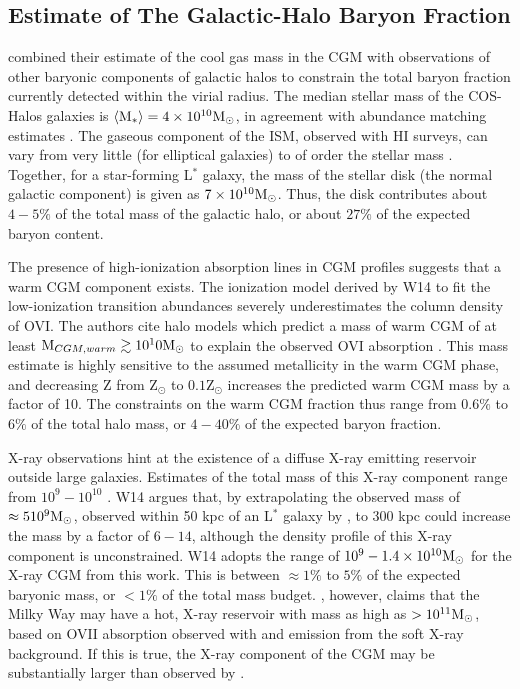 \subsection{Estimate of The Galactic-Halo Baryon Fraction}
\label{sec:Galaxy.Fraction}

\citet{Werk2014} combined their estimate of the cool gas mass in the
CGM with observations of other baryonic components of galactic halos
to constrain the total baryon fraction currently detected within the
virial radius. The median stellar mass of the COS-Halos galaxies is
$\left<\textrm{M}{}_*\right> = 4\times 10^{10}\textrm{M}_\odot$, in agreement with
abundance matching estimates \citep{Behroozi2010}. The gaseous
component of the ISM, observed with HI surveys, can vary from very
little (for elliptical galaxies) to of order the stellar mass
\citep{McGaugh2010, Martin2010}. Together, for a star-forming L$^*$
galaxy, the mass of the stellar disk (the normal galactic component)
is given as $7\times 10^{10}\textrm{M}_\odot{}$. Thus, the disk contributes about
$4-5\%$ of the total mass of the galactic halo, or about $27\%$ of the
expected baryon content.

The presence of high-ionization absorption lines in CGM profiles
suggests that a warm CGM component exists. The ionization model
derived by W14 to fit the low-ionization transition
abundances severely underestimates the column density of OVI. The
authors cite halo models which predict a mass of warm CGM of at least
$\textrm{M}_{CGM, warm} \gtrsim 10^10\textrm{M}_\odot{}$ to explain the observed OVI
absorption \citep{Peeples2014}. This mass estimate is highly sensitive
to the assumed metallicity in the warm CGM phase, and decreasing Z
from Z$_\odot$ to $0.1$Z$_\odot$ increases the predicted warm CGM mass
by a factor of 10. The constraints on the warm CGM fraction thus range
from $0.6\%$ to $6\%$ of the total halo mass, or $4-40\%$ of the
expected baryon fraction. 

X-ray observations hint at the existence of a diffuse X-ray emitting
reservoir outside large galaxies. Estimates of the total mass of this
X-ray component range from $10^9 - 10^{10}$ \Msun{}. W14 argues that,
by extrapolating the observed mass of $\approx 510^9\textrm{M}_\odot{}$, observed
within 50 kpc of an L$^*$ galaxy by \Rosat{} \citep{Anderson2013}, to
300 kpc could increase the mass by a factor of $6-14$, although the
density profile of this X-ray component is unconstrained. W14 adopts
the range of $10^9 - 1.4\times 10^{10}\textrm{M}_\odot{}$ for the X-ray CGM from this
work. This is between $\approx 1\%$ to $5\%$ of the expected baryonic
mass, or $<1\%$ of the total mass budget. \citet{Gupta2012}, however,
claims that the Milky Way may have a hot, X-ray reservoir with mass as
high as $>10^{11}\textrm{M}_\odot{}$, based on OVII absorption observed with
\XMM{} and emission from the soft X-ray background. If this is true,
the X-ray component of the CGM may be substantially larger than
observed by \citet{Anderson2013}. 

